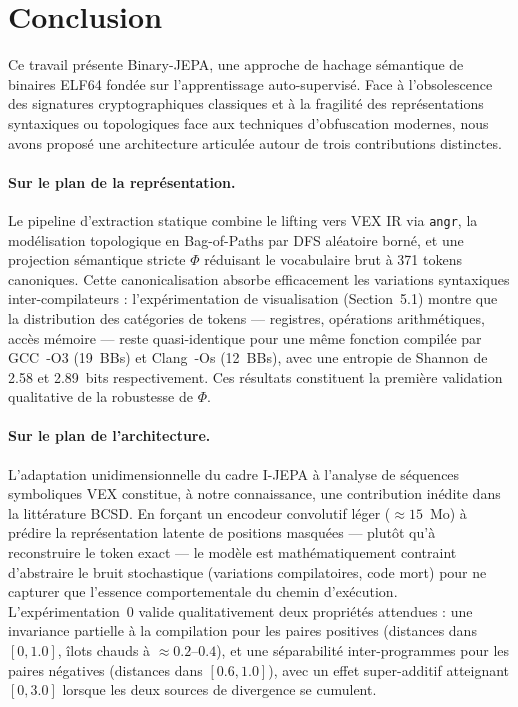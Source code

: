 \section{Conclusion}\label{sec:Conclusion} %

Ce travail présente Binary-JEPA, une approche de hachage sémantique de binaires ELF64
fondée sur l'apprentissage auto-supervisé. Face à l'obsolescence des signatures
cryptographiques classiques et à la fragilité des représentations syntaxiques ou
topologiques face aux techniques d'obfuscation modernes, nous avons proposé une
architecture articulée autour de trois contributions distinctes.

\paragraph{Sur le plan de la représentation.} Le pipeline d'extraction statique combine le
lifting vers VEX IR via \texttt{angr}, la modélisation topologique en Bag-of-Paths par
DFS aléatoire borné, et une projection sémantique stricte $\Phi$ réduisant le vocabulaire
brut à 371 tokens canoniques. Cette canonicalisation absorbe efficacement les variations
syntaxiques inter-compilateurs : l'expérimentation de visualisation (Section~5.1) montre
que la distribution des catégories de tokens — registres, opérations arithmétiques, accès
mémoire — reste quasi-identique pour une même fonction compilée par GCC~-O3 (19~BBs) et
Clang~-Os (12~BBs), avec une entropie de Shannon de 2.58 et 2.89~bits respectivement.
Ces résultats constituent la première validation qualitative de la robustesse de $\Phi$.

\paragraph{Sur le plan de l'architecture.} L'adaptation unidimensionnelle du cadre I-JEPA à
l'analyse de séquences symboliques VEX constitue, à notre connaissance, une contribution
inédite dans la littérature BCSD. En forçant un encodeur convolutif léger ($\approx
15$~Mo) à prédire la représentation latente de positions masquées — plutôt qu'à
reconstruire le token exact — le modèle est mathématiquement contraint d'abstraire le
bruit stochastique (variations compilatoires, code mort) pour ne capturer que l'essence
comportementale du chemin d'exécution. L'expérimentation~0 valide qualitativement deux
propriétés attendues : une invariance partielle à la compilation pour les paires positives
(distances dans $[0, 1.0]$, îlots chauds à $\approx 0.2$--$0.4$), et une séparabilité
inter-programmes pour les paires négatives (distances dans $[0.6, 1.0]$), avec un effet
super-additif atteignant $[0, 3.0]$ lorsque les deux sources de divergence se cumulent.

